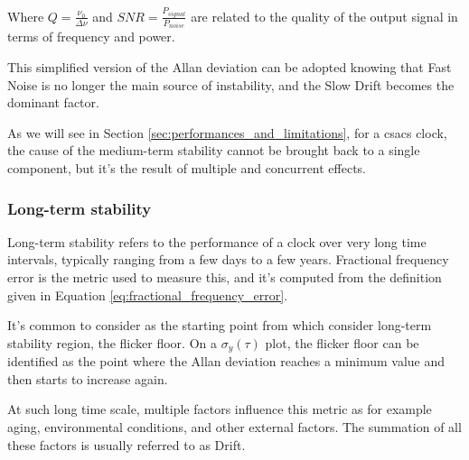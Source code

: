 Where $Q = \frac{\nu_0}{\Delta \nu}$ and $SNR = \frac{P_{signal}}{P_{noise}}$ are related to the quality of the output signal in terms of frequency and power.

This simplified version of the Allan deviation can be adopted knowing that Fast Noise is no longer the main source of instability, and the Slow Drift becomes the dominant factor.

As we will see in Section \ref{sec:performances_and_limitations}, for a \acrshort{csacs} clock, the cause of the medium-term stability cannot be brought back to a single component, but it's the result of multiple and concurrent effects.

\subsubsection{Long-term stability}

Long-term stability refers to the performance of a clock over very long time intervals, typically ranging from a few days to a few years.
Fractional frequency error is the metric used to measure this, and it's computed from the definition given in Equation \ref{eq:fractional_frequency_error}.

It's common to consider as the starting point from which consider long-term stability region, the flicker floor.
On a $\sigma_y(\tau)$ plot, the flicker floor can be identified as the point where the Allan deviation reaches a minimum value and then starts to increase again.

At such long time scale, multiple factors influence this metric as for example aging, environmental conditions, and other external factors.
The summation of all these factors is usually referred to as Drift.

